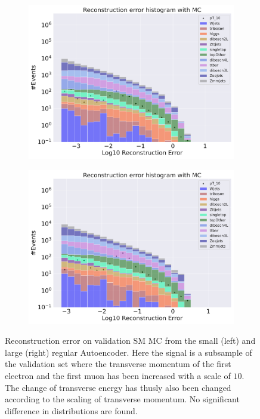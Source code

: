 \begin{figure}[h!]
    \centering
    \begin{subfigure}{.45\textwidth}
        \includegraphics[width=\textwidth]{Figures/AE_testing/small/b_data_recon_big_rm3_feats_sig_pT_10.pdf}
        \caption{}
        \label{fig:ae_small_pt_10}
    \end{subfigure}
    \hfill 
    \begin{subfigure}{.45\textwidth}
        \includegraphics[width=\textwidth]{Figures/AE_testing/big/b_data_recon_big_rm3_feats_sig_pT_10.pdf}
        \caption{}
        \label{fig:ae_big_pt_10}
    \end{subfigure}
    \hfill 
    \caption[AE | Reconstruction error $p_T$ altering of 10]{Reconstruction error on validation SM MC from the small (left) and large (right) regular Autoencoder. Here the signal is a subsample of the validation 
    set where the transverse momentum of the first electron and the first muon has been increased with a scale of $10$. The change of transverse 
    energy has thusly also been changed according to the scaling of transverse momentum. No significant difference in distributions are found. }
    \label{fig:ae_big_small_pt_10}
\end{figure}



